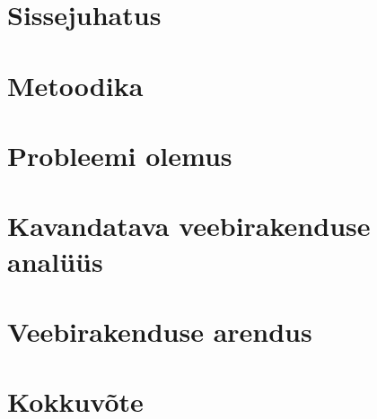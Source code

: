 \chapter{Sissejuhatus}\label{chapter:introduction}


\chapter{Metoodika}\label{chapter:metodology}


\chapter{Probleemi olemus}\label{chapter:problem_statement}


\chapter{Kavandatava veebirakenduse analüüs}\label{chapter:analysis}


\chapter{Veebirakenduse arendus}\label{chapter:development}


\chapter{Kokkuvõte}\label{chapter:summary} 

